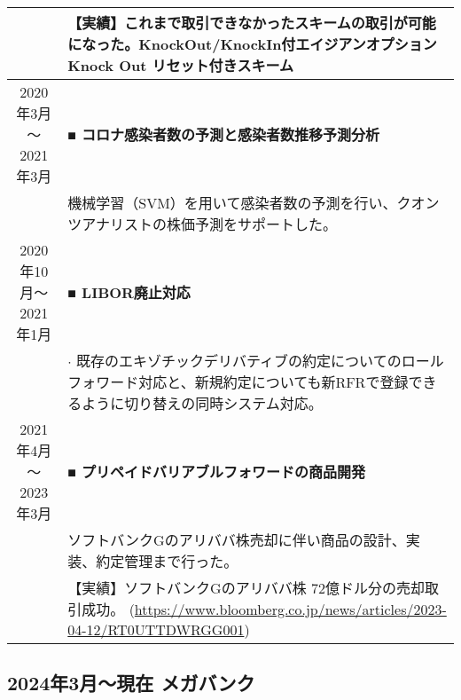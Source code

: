 \documentclass[uplatex,a4j,10.5pt,dvipdfmx]{jsarticle}
\begin{document}
\begin{longtable}{|c|p{14cm}|}
	                                  & 【実績】これまで取引できなかったスキームの取引が可能になった。KnockOut/KnockIn付エイジアンオプション Knock Out リセット付きスキーム                                                                                         \\
	\hline
	2020年3月～2021年3月                   & \textbf{■ コロナ感染者数の予測と感染者数推移予測分析}                                                                                                                                        \\
	                                  & 機械学習（SVM）を用いて感染者数の予測を行い、クオンツアナリストの株価予測をサポートした。                                                                                                                          \\
	\hline
	2020年10月～2021年1月                  & \textbf{■ LIBOR廃止対応}                                                                                                                                                    \\
	                                  & $\cdot$ 既存のエキゾチックデリバティブの約定についてのロールフォワード対応と、新規約定についても新RFRで登録できるように切り替えの同時システム対応。                                                                                         \\
	\hline
	2021年4月～2023年3月                   & \textbf{■ プリペイドバリアブルフォワードの商品開発}                                                                                                                                         \\
	                                  & ソフトバンクGのアリババ株売却に伴い商品の設計、実装、約定管理まで行った。                                                                                                                                   \\
	                                  & 【実績】ソフトバンクGのアリババ株 72億ドル分の売却取引成功。 (\url{https://www.bloomberg.co.jp/news/articles/2023-04-12/RT0UTTDWRGG001})                                                            \\
	\hline
\end{longtable}

\subsection{2024年3月～現在 メガバンク}
\end{document}
